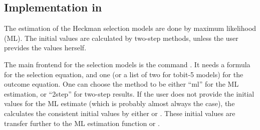 \subsection[Implementation]{Implementation in }

The estimation of the Heckman selection models are done by maximum
likelihood (ML).  The initial values are calculated by two-step methods,
unless the user prevides the values herself.  

The main frontend for the selection models is the command
.  It needs a formula for the selection equation, and
one (or a list of two for tobit-5 models) for the outcome equation.
One can choose the method to be either ``ml'' for the ML estimation,
or ``2step'' for two-step results.  If the user does not provide the
initial values for the ML estimate (which is probably almost always
the case), the  calculates the consistent initial
values by either  or .  These initial
values are transfer further to the ML estimation function
 or .

